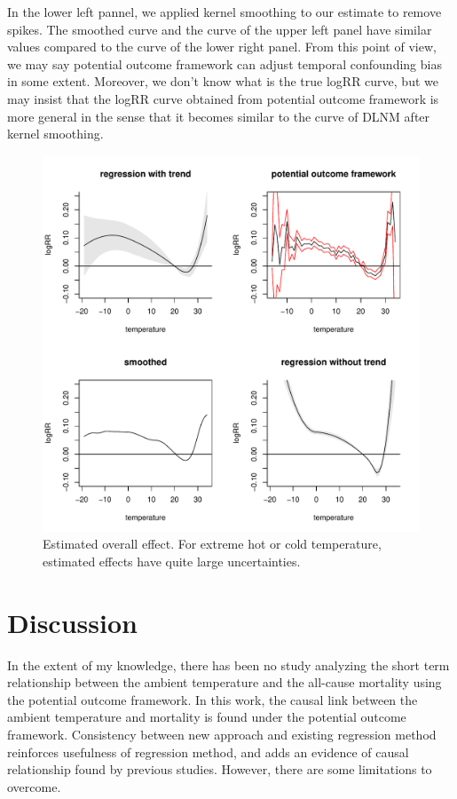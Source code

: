 \documentclass[12pt]{article}
\begin{document}
In the lower left pannel, we applied kernel smoothing to our estimate to remove spikes.
The smoothed curve and the curve of the upper left panel have similar values 
compared to the curve of the lower right panel.
From this point of view, 
we may say potential outcome framework can adjust temporal confounding bias in some extent.
Moreover, we don't know what is the true logRR curve,
but we may insist that the logRR curve obtained from potential outcome framework is more general
in the sense that it becomes similar to the curve of DLNM after kernel smoothing.

\begin{figure}
	\includegraphics[width = \textwidth]{figures/main1.pdf}
	\caption[Figure 1.]{Estimated overall effect. 
	For extreme hot or cold temperature, estimated effects have quite large uncertainties.}
\end{figure}

\section{Discussion}

In the extent of my knowledge, there has been no study analyzing the short term relationship 
between the ambient temperature and the all-cause mortality using the potential outcome framework.
In this work, the causal link between the ambient temperature and mortality 
is found under the potential outcome framework.
Consistency between new approach and existing regression method reinforces
usefulness of regression method, and adds an evidence of causal relationship found by previous studies.
However, there are some limitations to overcome.
\end{document}
